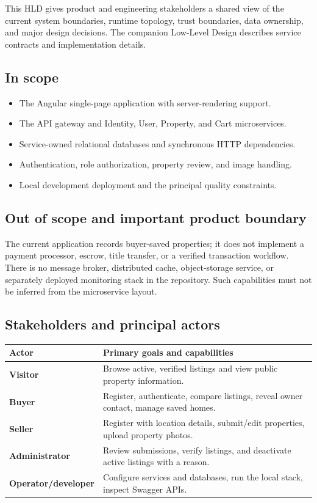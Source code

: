 \documentclass[11pt,a4paper]{article}
\begin{document}
This HLD gives product and engineering stakeholders a shared view of the current
system boundaries, runtime topology, trust boundaries, data ownership, and major
design decisions. The companion Low-Level Design describes service contracts and
implementation details.

\subsection{In scope}
\begin{itemize}
  \item The Angular single-page application with server-rendering support.
  \item The API gateway and Identity, User, Property, and Cart microservices.
  \item Service-owned relational databases and synchronous HTTP dependencies.
  \item Authentication, role authorization, property review, and image handling.
  \item Local development deployment and the principal quality constraints.
\end{itemize}

\subsection{Out of scope and important product boundary}
The current application records buyer-saved properties; it does not implement a
payment processor, escrow, title transfer, or a verified transaction workflow.
There is no message broker, distributed cache, object-storage service, or separately
deployed monitoring stack in the repository. Such capabilities must not be inferred
from the microservice layout.

\subsection{Stakeholders and principal actors}
\begin{tabularx}{\textwidth}{>{\bfseries}p{28mm} X}
\toprule
Actor & Primary goals and capabilities\\
\midrule
Visitor & Browse active, verified listings and view public property information.\\
Buyer & Register, authenticate, compare listings, reveal owner contact, manage saved homes.\\
Seller & Register with location details, submit/edit properties, upload property photos.\\
Administrator & Review submissions, verify listings, and deactivate active listings with a reason.\\
Operator/developer & Configure services and databases, run the local stack, inspect Swagger APIs.\\
\bottomrule
\end{tabularx}
\end{document}

